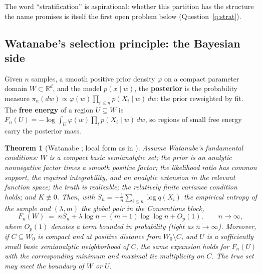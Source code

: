 \documentclass[11pt]{amsart}
\theoremstyle{plain}
\newtheorem{theorem}{Theorem}[section]
\theoremstyle{definition}
\newcommand{\R}{\mathbb{R}}
\begin{document}
The word ``stratification'' is aspirational: whether this partition has the structure the name promises is itself the first open problem below (Question~\ref{q:strat}).

\subsection{Watanabe's selection principle: the Bayesian side}\label{sec:bayes}

Given $n$ samples, a smooth positive prior density $\varphi$ on a compact parameter domain $W \subset \R^d$, and the model $p(x \mid w)$, the \textbf{posterior} is the probability measure $\pi_n(dw) \propto \varphi(w) \prod_{i \le n} p(X_i \mid w)\, dw$: the prior reweighted by fit. The \textbf{free energy} of a region $U \subseteq W$ is $F_n(U) = -\log \int_U \varphi(w) \prod_i p(X_i \mid w)\, dw$, so regions of small free energy carry the posterior mass.

\begin{theorem}[Watanabe \cite{watanabe2009}; local form as in \cite{lau2023}]\label{thm:watanabe}
Assume Watanabe's fundamental conditions: $W$ is a compact basic semianalytic set; the prior is an analytic nonnegative factor times a smooth positive factor; the likelihood ratio has common support, the required integrability, and an analytic extension in the relevant function space; the truth is realizable; the relatively finite variance condition holds; and $K\not\equiv0$. Then, with $S_n = -\tfrac1n \sum_{i \le n} \log q(X_i)$ the empirical entropy of the sample and $(\lambda, m)$ the global pair in the Conventions block,
\[
   F_n(W) \;=\; n S_n + \lambda \log n - (m - 1) \log\log n + O_p(1), \qquad n \to \infty,
\]
where $O_p(1)$ denotes a term bounded in probability (tight as $n \to \infty$).
Moreover, if $C \subseteq W_0$ is compact and at positive distance from $W_0 \setminus C$, and $U$ is a sufficiently small basic semianalytic neighborhood of $C$, the same expansion holds for $F_n(U)$ with the corresponding minimum and maximal tie multiplicity on $C$. The true set may meet the boundary of $W$ or $U$.
\end{theorem}
\end{document}
